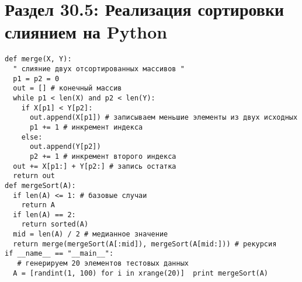 \section*{Раздел 30.5: Реализация сортировки слиянием на Python}
\begin{tcolorbox}
\begin{verbatim}
def merge(X, Y):
  " слияние двух отсортированных массивов "
  p1 = p2 = 0
  out = [] # конечный массив
  while p1 < len(X) and p2 < len(Y):
    if X[p1] < Y[p2]:
      out.append(X[p1]) # записываем меньшие элементы из двух исходных
      p1 += 1 # инкремент индекса
    else:
      out.append(Y[p2])
      p2 += 1 # инкремент второго индекса
  out += X[p1:] + Y[p2:] # запись остатка
  return out
def mergeSort(A):
  if len(A) <= 1: # базовые случаи
    return A
  if len(A) == 2:
    return sorted(A)
  mid = len(A) / 2 # медианное значение
  return merge(mergeSort(A[:mid]), mergeSort(A[mid:])) # рекурсия
if __name__ == "__main__":
   # генерируем 20 элементов тестовых данных
  A = [randint(1, 100) for i in xrange(20)]  print mergeSort(A)
\end{verbatim}
\end{tcolorbox}
